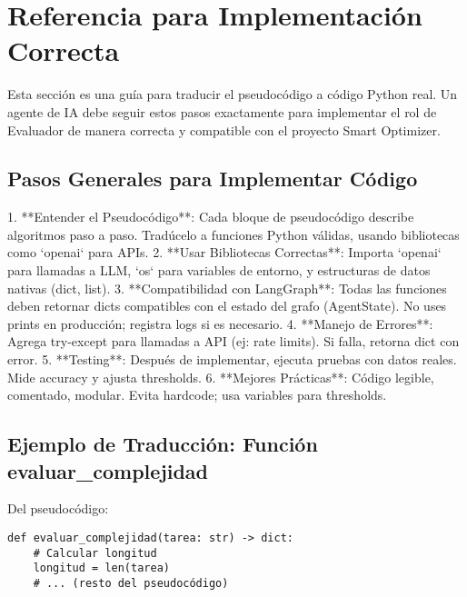 \documentclass{article}
\begin{document}
\section{Referencia para Implementación Correcta}
Esta sección es una guía para traducir el pseudocódigo a código Python real. Un agente de IA debe seguir estos pasos exactamente para implementar el rol de Evaluador de manera correcta y compatible con el proyecto Smart Optimizer.

\subsection{Pasos Generales para Implementar Código}
1. **Entender el Pseudocódigo**: Cada bloque de pseudocódigo describe algoritmos paso a paso. Tradúcelo a funciones Python válidas, usando bibliotecas como `openai` para APIs.
2. **Usar Bibliotecas Correctas**: Importa `openai` para llamadas a LLM, `os` para variables de entorno, y estructuras de datos nativas (dict, list).
3. **Compatibilidad con LangGraph**: Todas las funciones deben retornar dicts compatibles con el estado del grafo (AgentState). No uses prints en producción; registra logs si es necesario.
4. **Manejo de Errores**: Agrega try-except para llamadas a API (ej: rate limits). Si falla, retorna dict con error.
5. **Testing**: Después de implementar, ejecuta pruebas con datos reales. Mide accuracy y ajusta thresholds.
6. **Mejores Prácticas**: Código legible, comentado, modular. Evita hardcode; usa variables para thresholds.

\subsection{Ejemplo de Traducción: Función evaluar_complejidad}
Del pseudocódigo:
\begin{lstlisting}
def evaluar_complejidad(tarea: str) -> dict:
    # Calcular longitud
    longitud = len(tarea)
    # ... (resto del pseudocódigo)
\end{lstlisting}
\end{document}
